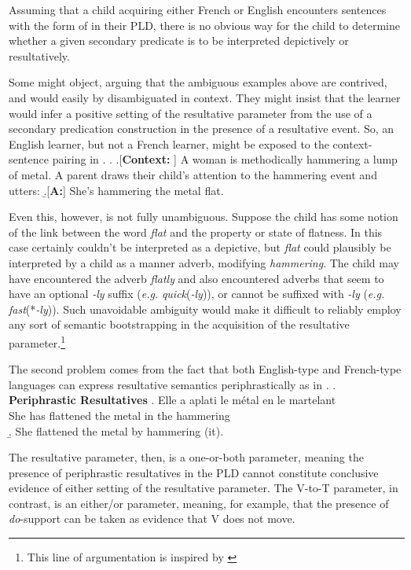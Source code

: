 Assuming that a child acquiring either French or English encounters sentences with the form of \LLast in their PLD, there is no obvious way for the child to determine whether a given secondary predicate is to be interpreted depictively or resultatively.

Some might object, arguing that the ambiguous examples above are contrived, and would easily by disambiguated in context.
They might insist that the learner would infer a positive setting of the resultative parameter from the use of a secondary predication construction in the presence of a resultative event.
So, an English learner, but not a French learner, might be exposed to the context-sentence pairing in \Next.
\ex. 
\a.[\textbf{Context:} ] A woman is methodically hammering a lump of metal.
A parent draws their child's attention to the hammering event and utters:
\b.[\textbf{A:}] She's hammering the metal flat.

Even this, however, is not fully unambiguous.
Suppose the child has some notion of the link between the word \textit{flat} and the property or state of flatness.
In this case \Last[b] certainly couldn't be interpreted as a depictive, but \textit{flat} could plausibly be interpreted by a child as a manner adverb, modifying \textit{hammering}.
The child may have encountered the adverb \textit{flatly} and also encountered adverbs that seem to have an optional \textit{-ly} suffix (\textit{e.g.} \textit{quick}(\textit{-ly})), or cannot be suffixed with \textit{-ly} (\textit{e.g.} \textit{fast}(*\textit{-ly})).
Such unavoidable ambiguity would make it difficult to reliably employ any sort of semantic bootstrapping in the acquisition of the resultative parameter.\footnote{
	This line of argumentation is inspired by \textcite{gleitman1990structural,carey1985constraints,quine1960word} 
}

The second problem comes from the fact that both English-type and French-type languages can express resultative semantics periphrastically as in \Next.
\ex. \textbf{Periphrastic Resultatives}
\ag. Elle a aplati le m\'etal en le martelant\\
She has flattened the metal in the hammering\\
\b. She flattened the metal by hammering (it).

The resultative parameter, then, is a one-or-both parameter, meaning the presence of periphrastic resultatives in the PLD cannot constitute conclusive evidence of either setting of the resultative parameter.
The V-to-T parameter, in contrast, is an either/or parameter, meaning, for example, that the presence of \textit{do}-support can be taken as evidence that V does not move.

